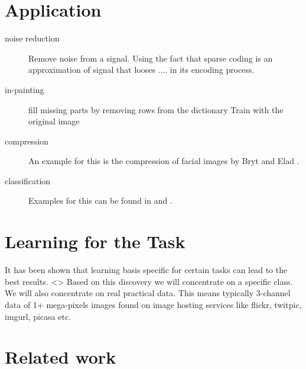 \section{Application}

\begin{description}
\item[noise reduction]
Remove noise from a signal. Using the fact that sparse coding 
is an approximation of signal that looses .... in its encoding process. 
\cite{Elad2006}

\item[in-painting]
fill missing parts by removing rows from the dictionary
Train with the original image
\cite{mairal08sparse}

\item[compression] An example for this is the compression of facial images by Bryt and Elad \cite{Bryt2008}.
\item[classification] Examples for this can be found in \cite{Mairal2008b} and \cite{Bar2009}.
\end{description}


\section{Learning for the Task}
It has been shown that learning basis specific for certain tasks can lead to the best results\cite{}.  <>
Based on this discovery we will concentrate on a specific class. 
We will also concentrate on real practical data. This means typically 3-channel data of 1+ mega-pixels images found on image hosting services like flickr, twitpic, imgurl, picasa etc.


\section{Related work}

